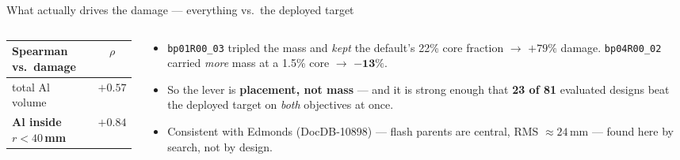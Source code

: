 \documentclass[aspectratio=169,10pt]{beamer}
\begin{document}
\begin{frame}{What actually drives the damage --- everything vs.\ the deployed target}
\begin{columns}[T]
\begin{column}{0.46\textwidth}
\begin{tabular}{@{}lc@{}}
\toprule
Spearman vs.\ damage & $\rho$ \\
\midrule
total Al volume            & $+0.57$ \\
\textbf{Al inside $r<40$\,mm} & $\mathbf{+0.84}$ \\
\bottomrule
\end{tabular}
\end{column}
\begin{column}{0.52\textwidth}
\scriptsize
\begin{itemize}
  \item \texttt{bp01R00\_03} tripled the mass and \emph{kept} the default's 22\% core
        fraction $\rightarrow$ $+79\%$ damage. \texttt{bp04R00\_02} carried \emph{more}
        mass at a 1.5\% core $\rightarrow$ $\mathbf{-13\%}$.
  \item So the lever is \textbf{placement, not mass} --- and it is strong enough that
        \textbf{23 of 81} evaluated designs beat the deployed target on
        \emph{both} objectives at once.
  \item Consistent with Edmonds (DocDB-10898) --- flash parents are central,
        RMS $\approx24$\,mm --- found here by search, not by design.
\end{itemize}
\end{column}
\end{columns}
\end{frame}
\end{document}
